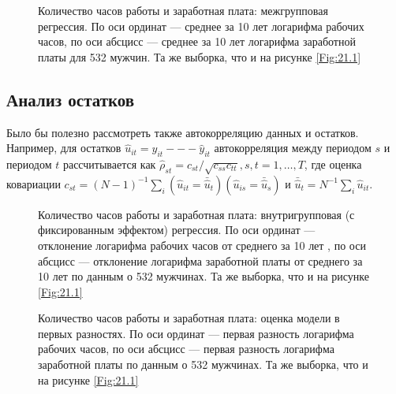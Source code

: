  \begin{figure}[ht]
                \begin{center}
                    \caption{Количество часов работы и заработная плата: межгрупповая регрессия. По оси ординат --- среднее за 10 лет логарифма рабочих часов, по оси абсцисс  --- среднее за 10 лет логарифма заработной платы для 532 мужчин. Та же выборка, что и на рисунке \ref{Fig:21.1}}
                    \label{Fig:21.2}
                \end{center}
     \end{figure}

\subsection{Анализ остатков}

Было бы полезно рассмотреть также автокорреляцию данных и остатков. Например, для остатков $\hat{u}_{it}=y_{it} --- \hat{y}_{it}$ автокорреляция между периодом $s$ и периодом $t$ рассчитывается как $\hat{\rho}_{st} = c_{st}/\sqrt{c_{ss} c_{tt}}, s, t = 1, \dots, T$, где оценка ковариации  $c_{st}=(N-1)^{-1} \sum_i (\hat{u}_{it} = \bar{\hat{u}}_t)(\hat{u}_{is} = \bar{\hat{u}}_s)$ и $\bar{\hat{u}}_t= N^{-1} \sum_i \hat{u}_{it}$.

 \begin{figure}[ht]
                \begin{center}
                    \caption{Количество часов работы и заработная плата: внутригрупповая (с фиксированным эффектом) регрессия. По оси ординат --- отклонение логарифма рабочих часов от среднего за 10 лет , по оси абсцисс --- отклонение логарифма заработной платы от среднего за 10 лет  по данным о 532 мужчинах. Та же выборка, что и на рисунке \ref{Fig:21.1}}
                    \label{Fig:21.3}
                \end{center}
     \end{figure}

 \begin{figure}[ht]
                \begin{center}
                    \caption{Количество часов работы и заработная плата: оценка модели в первых разностях. По оси ординат --- первая разность логарифма рабочих часов, по оси абсцисс --- первая разность логарифма заработной платы по данным о 532 мужчинах. Та же выборка, что и на рисунке \ref{Fig:21.1}}
                    \label{Fig:21.4}
                \end{center}
     \end{figure}

